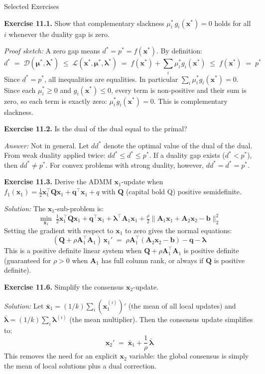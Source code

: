 \documentclass[aspectratio=169,10pt]{beamer}
\newcommand{\bx}{\mathbf{x}}
\newcommand{\bA}{\mathbf{A}}
\newcommand{\bb}{\mathbf{b}}
\newcommand{\bmu}{\boldsymbol{\mu}}
\newcommand{\blam}{\boldsymbol{\lambda}}
\newcommand{\calL}{\mathcal{L}}
\newcommand{\calD}{\mathcal{D}}
\begin{document}
\begin{frame}[allowframebreaks]{Selected Exercises}

  \textbf{Exercise 11.1.}  Show that complementary slackness
  $\mu_i^*\, g_i(\bx^*) = 0$ holds for all $i$ whenever the duality gap
  is zero.

  \medskip
  \textit{Proof sketch:}  A zero gap means $d^* = p^* = f(\bx^*)$.
  By definition:
  \[
    d^* \;=\; \calD(\bmu^*, \blam^*)
         \;\le\; \calL(\bx^*, \bmu^*, \blam^*)
         \;=\; f(\bx^*) + \sum_i \mu_i^* g_i(\bx^*)
         \;\le\; f(\bx^*) \;=\; p^*
  \]
  Since $d^* = p^*$, all inequalities are equalities.  In particular
  $\sum_i \mu_i^* g_i(\bx^*) = 0$.  Since each $\mu_i^* \ge 0$ and
  $g_i(\bx^*) \le 0$, every term is non-positive and their sum is zero,
  so each term is exactly zero: $\mu_i^* g_i(\bx^*) = 0$.  This is
  complementary slackness.

  \bigskip
  \textbf{Exercise 11.2.}  Is the dual of the dual equal to the primal?

  \medskip
  \textit{Answer:}  Not in general.  Let $dd^*$ denote the optimal
  value of the dual of the dual.  From weak duality applied twice:
  $dd^* \le d^* \le p^*$.  If a duality gap exists ($d^* < p^*$),
  then $dd^* \ne p^*$.  For convex problems with strong duality,
  however, $dd^* = d^* = p^*$.

  \framebreak

  \textbf{Exercise 11.3.}  Derive the ADMM $\bx_1$-update when
  $f_1(\bx_1) = \frac{1}{2}\bx_1^\top \mathbf{Q}\bx_1 + \mathbf{q}^\top\bx_1 + q$
  with $\mathbf{Q}$ (capital bold Q) positive semidefinite.

  \medskip
  \textit{Solution:}  The $\bx_1$-sub-problem is:
  \[
    \min_{\bx_1}\; \tfrac{1}{2}\bx_1^\top\mathbf{Q}\bx_1
    + \mathbf{q}^\top\bx_1 + \blam^\top\bA_1\bx_1
    + \tfrac{\rho}{2}\|\bA_1\bx_1 + \bA_2\bx_2 - \bb\|_2^2
  \]
  Setting the gradient with respect to $\bx_1$ to zero gives the
  normal equations:
  \[
    (\mathbf{Q} + \rho\bA_1^\top\bA_1)\,\bx_1'
    \;=\; \rho\bA_1^\top(\bA_2\bx_2 - \bb) - \mathbf{q} - \blam
  \]
  This is a positive definite linear system when $\mathbf{Q} + \rho\bA_1^\top\bA_1$
  is positive definite (guaranteed for $\rho > 0$ when $\bA_1$ has full
  column rank, or always if $\mathbf{Q}$ is positive definite).

  \bigskip
  \textbf{Exercise 11.6.}  Simplify the consensus $\bx_2$-update.

  \medskip
  \textit{Solution:}  Let $\bar{\bx}_1 = (1/k)\sum_i (\bx_1^{(i)})'$
  (the mean of all local updates) and $\bar{\blam} = (1/k)\sum_i \blam^{(i)}$
  (the mean multiplier).  Then the consensus update simplifies to:
  \[
    \bx_2' \;=\; \bar{\bx}_1 + \frac{1}{\rho}\,\bar{\blam}
  \]
  This removes the need for an explicit $\bx_2$ variable: the global
  consensus is simply the mean of local solutions plus a dual correction.

\end{frame}
\end{document}
